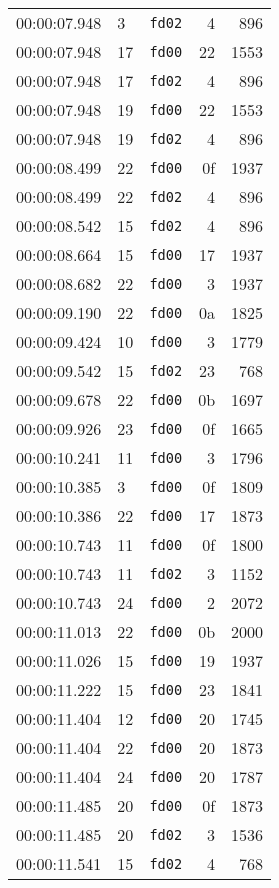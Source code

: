 \documentclass{article}
\begin{document}
\begin{longtable}{lllrr}
00:00:07.948 & 3 & \texttt{fd02} & 4 & 896 \\
00:00:07.948 & 17 & \texttt{fd00} & 22 & 1553 \\
00:00:07.948 & 17 & \texttt{fd02} & 4 & 896 \\
00:00:07.948 & 19 & \texttt{fd00} & 22 & 1553 \\
00:00:07.948 & 19 & \texttt{fd02} & 4 & 896 \\
00:00:08.499 & 22 & \texttt{fd00} & 0f & 1937 \\
00:00:08.499 & 22 & \texttt{fd02} & 4 & 896 \\
00:00:08.542 & 15 & \texttt{fd02} & 4 & 896 \\
00:00:08.664 & 15 & \texttt{fd00} & 17 & 1937 \\
00:00:08.682 & 22 & \texttt{fd00} & 3 & 1937 \\
00:00:09.190 & 22 & \texttt{fd00} & 0a & 1825 \\
00:00:09.424 & 10 & \texttt{fd00} & 3 & 1779 \\
00:00:09.542 & 15 & \texttt{fd02} & 23 & 768 \\
00:00:09.678 & 22 & \texttt{fd00} & 0b & 1697 \\
00:00:09.926 & 23 & \texttt{fd00} & 0f & 1665 \\
00:00:10.241 & 11 & \texttt{fd00} & 3 & 1796 \\
00:00:10.385 & 3 & \texttt{fd00} & 0f & 1809 \\
00:00:10.386 & 22 & \texttt{fd00} & 17 & 1873 \\
00:00:10.743 & 11 & \texttt{fd00} & 0f & 1800 \\
00:00:10.743 & 11 & \texttt{fd02} & 3 & 1152 \\
00:00:10.743 & 24 & \texttt{fd00} & 2 & 2072 \\
00:00:11.013 & 22 & \texttt{fd00} & 0b & 2000 \\
00:00:11.026 & 15 & \texttt{fd00} & 19 & 1937 \\
00:00:11.222 & 15 & \texttt{fd00} & 23 & 1841 \\
00:00:11.404 & 12 & \texttt{fd00} & 20 & 1745 \\
00:00:11.404 & 22 & \texttt{fd00} & 20 & 1873 \\
00:00:11.404 & 24 & \texttt{fd00} & 20 & 1787 \\
00:00:11.485 & 20 & \texttt{fd00} & 0f & 1873 \\
00:00:11.485 & 20 & \texttt{fd02} & 3 & 1536 \\
00:00:11.541 & 15 & \texttt{fd02} & 4 & 768 \\

\end{longtable}
\end{document}
